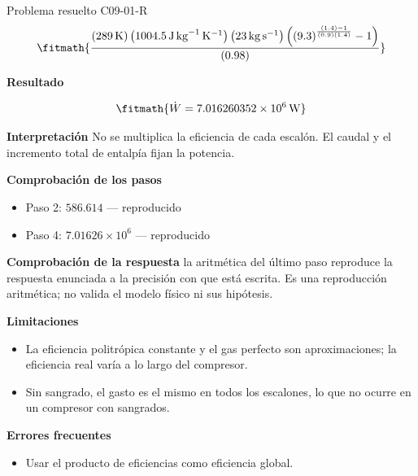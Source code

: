 \documentclass[10pt,openany]{book}
\begin{document}
\begin{studiumworked}{Problema resuelto C09-01-R}
\[
\fitmath{\frac{\left(289\,\mathrm{K}\right) \left(1004.5\,\mathrm{J}\,\mathrm{kg}^{-1}\,\mathrm{K}^{-1}\right) \left(23\,\mathrm{kg}\,\mathrm{s}^{-1}\right) \left(\left(9.3\right)^{\frac{\left(1.4\right) - 1}{\left(0.9\right) \left(1.4\right)}} - 1\right)}{\left(0.98\right)}}
\]

\noindent\textbf{Resultado}

\[
\fitmath{\dot{W}=7.016260352\times10^{6}\,\mathrm{W}}
\]

\noindent\textbf{Interpretación}
No se multiplica la eficiencia de cada escalón. El caudal y el incremento total de entalpía fijan la potencia.

\noindent\textbf{Comprobación de los pasos}
\begin{itemize}
\item Paso 2: $586.614$ — reproducido
\item Paso 4: $7.01626\times 10^{6}$ — reproducido
\end{itemize}

\noindent\textbf{Comprobación de la respuesta} la aritmética del último paso reproduce la respuesta enunciada a la precisión con que está escrita. Es una reproducción aritmética; no valida el modelo físico ni sus hipótesis.

\noindent\textbf{Limitaciones}
\begin{itemize}
\item La eficiencia politrópica constante y el gas perfecto son aproximaciones; la eficiencia real varía a lo largo del compresor.
\item Sin sangrado, el gasto es el mismo en todos los escalones, lo que no ocurre en un compresor con sangrados.
\end{itemize}

\noindent\textbf{Errores frecuentes}
\begin{itemize}
\item Usar el producto de eficiencias como eficiencia global.
\end{itemize}
\end{studiumworked}
\end{document}
